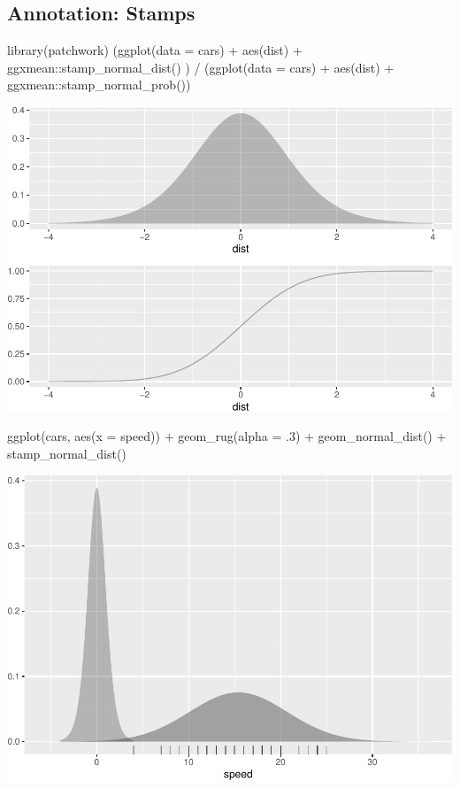 \documentclass[12pt]{article}
\newenvironment{Shaded}{\begin{snugshade}}{\end{snugshade}}
\newcommand{\AttributeTok}[1]{\textcolor[rgb]{0.77,0.63,0.00}{#1}}
\newcommand{\DecValTok}[1]{\textcolor[rgb]{0.00,0.00,0.81}{#1}}
\newcommand{\FunctionTok}[1]{\textcolor[rgb]{0.00,0.00,0.00}{#1}}
\newcommand{\NormalTok}[1]{#1}
\newcommand{\SpecialCharTok}[1]{\textcolor[rgb]{0.00,0.00,0.00}{#1}}
\begin{document}
\hypertarget{annotation-stamps}{%
\subsection{Annotation: Stamps}\label{annotation-stamps}}

\begin{Shaded}
\begin{Highlighting}[]
\FunctionTok{library}\NormalTok{(patchwork)}
\NormalTok{(}\FunctionTok{ggplot}\NormalTok{(}\AttributeTok{data =}\NormalTok{ cars) }\SpecialCharTok{+}
  \FunctionTok{aes}\NormalTok{(dist) }\SpecialCharTok{+}
\NormalTok{  ggxmean}\SpecialCharTok{::}\FunctionTok{stamp\_normal\_dist}\NormalTok{() ) }\SpecialCharTok{/}
\NormalTok{(}\FunctionTok{ggplot}\NormalTok{(}\AttributeTok{data =}\NormalTok{ cars) }\SpecialCharTok{+}
  \FunctionTok{aes}\NormalTok{(dist) }\SpecialCharTok{+}
\NormalTok{  ggxmean}\SpecialCharTok{::}\FunctionTok{stamp\_normal\_prob}\NormalTok{())}
\end{Highlighting}
\end{Shaded}

\begin{center}\includegraphics[width=0.5\linewidth]{manuscript_files/figure-latex/unnamed-chunk-9-1} \end{center}

\begin{Shaded}
\begin{Highlighting}[]
\FunctionTok{ggplot}\NormalTok{(cars, }\FunctionTok{aes}\NormalTok{(}\AttributeTok{x =}\NormalTok{ speed)) }\SpecialCharTok{+}
  \FunctionTok{geom\_rug}\NormalTok{(}\AttributeTok{alpha =}\NormalTok{ .}\DecValTok{3}\NormalTok{) }\SpecialCharTok{+}
  \FunctionTok{geom\_normal\_dist}\NormalTok{() }\SpecialCharTok{+} 
  \FunctionTok{stamp\_normal\_dist}\NormalTok{()}
\end{Highlighting}
\end{Shaded}

\begin{center}\includegraphics[width=0.5\linewidth]{manuscript_files/figure-latex/unnamed-chunk-10-1} \end{center}
\end{document}
